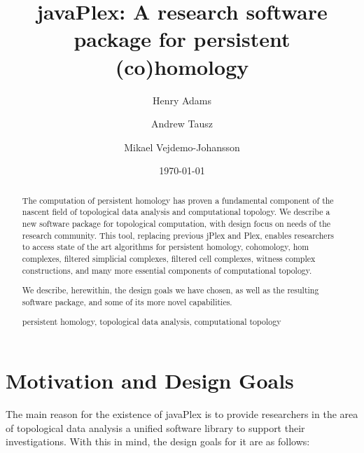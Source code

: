 \documentclass[runningheads,a4paper]{llncs}
\newcommand{\keywords}[1]{\par\addvspace\baselineskip
\noindent\keywordname\enspace\ignorespaces#1}
\begin{document}
\mainmatter

\title{javaPlex: A research software package for persistent (co)homology}
\author{Henry Adams
\and Andrew Tausz
\and Mikael Vejdemo-Johansson}


\date{\today}


\maketitle

\begin{abstract}
The computation of persistent homology has proven a fundamental component of the nascent field of topological data analysis and computational topology. We describe a new software package for topological computation, with design focus on needs of the research community. This tool, replacing previous jPlex and Plex, enables researchers to access state of the art algorithms for persistent homology, cohomology, hom complexes, filtered simplicial complexes, filtered cell complexes, witness complex constructions, and many more essential components of computational topology.

We describe, herewithin, the design goals we have chosen, as well as the resulting software package, and some of its more novel capabilities.

\keywords{persistent homology, topological data analysis,
  computational topology}
\end{abstract}

\section{Motivation and Design Goals}

The main reason for the existence of javaPlex is to provide researchers in the area of topological data analysis a unified software library to support their investigations. With this in mind, the design goals for it are as follows:
\end{document}
